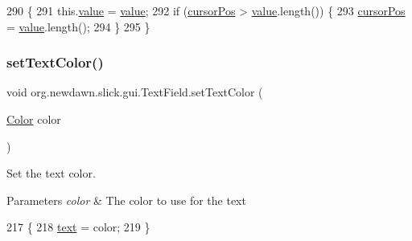 \begin{DoxyCode}
290                                       \{
291         this.\mbox{\hyperlink{classorg_1_1newdawn_1_1slick_1_1gui_1_1_text_field_a23c571aa0aa30ccbc28a090a06a444b7}{value}} = \mbox{\hyperlink{classorg_1_1newdawn_1_1slick_1_1gui_1_1_text_field_a23c571aa0aa30ccbc28a090a06a444b7}{value}};
292         \textcolor{keywordflow}{if} (\mbox{\hyperlink{classorg_1_1newdawn_1_1slick_1_1gui_1_1_text_field_a05994000bb672a1f49a9a8ee30ced3e5}{cursorPos}} > \mbox{\hyperlink{classorg_1_1newdawn_1_1slick_1_1gui_1_1_text_field_a23c571aa0aa30ccbc28a090a06a444b7}{value}}.length()) \{
293             \mbox{\hyperlink{classorg_1_1newdawn_1_1slick_1_1gui_1_1_text_field_a05994000bb672a1f49a9a8ee30ced3e5}{cursorPos}} = \mbox{\hyperlink{classorg_1_1newdawn_1_1slick_1_1gui_1_1_text_field_a23c571aa0aa30ccbc28a090a06a444b7}{value}}.length();
294         \}
295     \}
\end{DoxyCode}
\mbox{\label{classorg_1_1newdawn_1_1slick_1_1gui_1_1_text_field_aa1b3af85680ef374170b1b458d549439}} 
\subsubsection{\texorpdfstring{set\+Text\+Color()}{setTextColor()}}
{\footnotesize\ttfamily void org.\+newdawn.\+slick.\+gui.\+Text\+Field.\+set\+Text\+Color (\begin{DoxyParamCaption}\item[{\mbox{\hyperlink{classorg_1_1newdawn_1_1slick_1_1_color}{Color}}}]{color }\end{DoxyParamCaption})\hspace{0.3cm}{\ttfamily [inline]}}

Set the text color.


\begin{DoxyParams}{Parameters}
{\em color} & The color to use for the text \\
\hline
\end{DoxyParams}

\begin{DoxyCode}
217                                           \{
218         \mbox{\hyperlink{classorg_1_1newdawn_1_1slick_1_1gui_1_1_text_field_af66b269abe9cd0edb7ecb3f492031565}{text}} = color;
219     \}
\end{DoxyCode}


